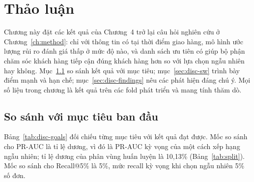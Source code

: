 \chapter{Thảo luận}\label{ch:discussion}

Chương này đặt các kết quả của Chương~4 trở lại câu hỏi nghiên cứu ở Chương~\ref{ch:method}: chỉ với thông tin có tại thời điểm giao hàng, mô hình ước lượng rủi ro đánh giá thấp ở mức độ nào, và danh sách ưu tiên có giúp bộ phận chăm sóc khách hàng tiếp cận đúng khách hàng hơn so với lựa chọn ngẫu nhiên hay không. Mục~\ref{sec:disc-goals} so sánh kết quả với mục tiêu; mục~\ref{sec:disc-sw} trình bày điểm mạnh và hạn chế; mục~\ref{sec:disc-findings} nêu các phát hiện đáng chú ý. Mọi số liệu trong chương là kết quả trên các fold phát triển và mang tính thăm dò.

\section{So sánh với mục tiêu ban đầu}\label{sec:disc-goals}

Bảng~\ref{tab:disc-goals} đối chiếu từng mục tiêu với kết quả đạt được. Mốc so sánh cho PR-AUC là tỉ lệ dương, vì đó là PR-AUC kỳ vọng của một cách xếp hạng ngẫu nhiên; tỉ lệ dương của phân vùng huấn luyện là 10,13\% (Bảng~\ref{tab:split}). Mốc so sánh cho Recall@5\% là 5\%, mức recall kỳ vọng khi chọn ngẫu nhiên 5\% số đơn.

